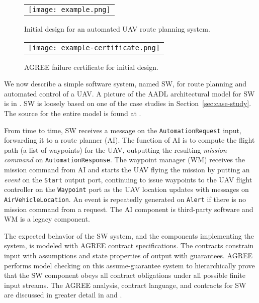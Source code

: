 \begin{figure*}[h]
  \begin{center}
    \begin{tabular}{c}
      \texttt{[image: example.png]}
    \end{tabular}
  \end{center}
\caption{Initial design for an automated UAV route planning system.}
\label{fig:example}
\end{figure*}

\begin{figure}
  \begin{center}
    \begin{tabular}{c}
      \texttt{[image: example-certificate.png]} \\
    \end{tabular}
  \end{center}
\caption{AGREE failure certificate for initial design.}
\label{fig:example-certificate}
\end{figure}

We now describe a simple software system, named SW, for route planning
and automated control of a UAV. A picture of the AADL architectural
model for SW is in . SW is loosely based on one of
the case studies in Section~\ref{sec:case-study}.  The source for the
entire model is found at \cite{repo}.

From time to time, SW receives a message on the \texttt{AutomationRequest} input,
forwarding it to a route planner (AI). The function of AI is to 
compute the flight path (a list of waypoints) for the UAV, outputting
the resulting \emph{mission command} on \texttt{AutomationResponse}.
The waypoint manager (WM) receives the mission command from AI and
starts the UAV flying the mission by putting an \emph{event} on the
\texttt{Start} output port, continuing to issue waypoints to the UAV
flight controller on the \texttt{Waypoint} port as the UAV location
updates with messages on \texttt{AirVehicleLocation}.
An event is repeatedly generated on \texttt{Alert} if there is no
mission command from a request. The AI component is third-party
software and WM is a legacy component.


The expected behavior of the SW system, and the components
implementing the system, is modeled with AGREE contract
specifications.  The contracts constrain input with assumptions and
state properties of output with guarantees.  AGREE performs model
checking on this assume-guarantee system to hierarchically prove that
the SW component obeys all contract obligations under all possible
finite input streams.  The AGREE analysis, contract language, and
contracts for SW are discussed in greater detail in
 and .

